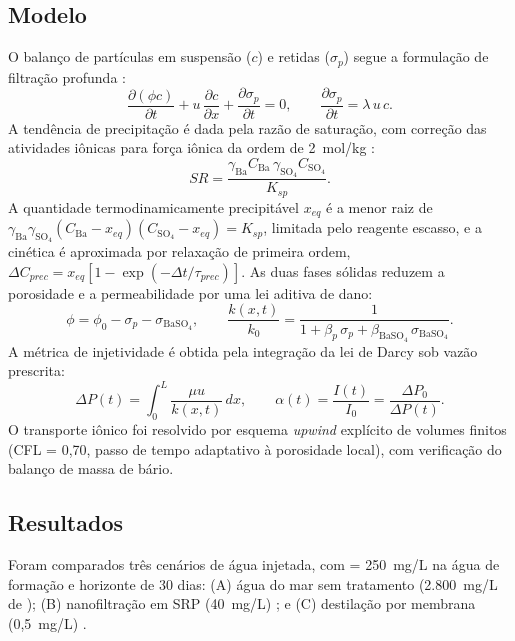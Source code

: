\documentclass[11pt,a4paper]{article}
\begin{document}
\subsection{Modelo}
O balanço de partículas em suspensão ($c$) e retidas ($\sigma_p$) segue a formulação de
filtração profunda \cite{pangsharma1997,bedrikovetsky2001}:
\begin{equation}
\frac{\partial (\phi c)}{\partial t} + u\,\frac{\partial c}{\partial x}
+ \frac{\partial \sigma_p}{\partial t} = 0, \qquad
\frac{\partial \sigma_p}{\partial t} = \lambda\, u\, c .
\end{equation}
A tendência de precipitação é dada pela razão de saturação, com correção das atividades
iônicas para força iônica da ordem de 2~mol/kg \cite{stumm1996,oddo1994}:
\begin{equation}
SR = \frac{\gamma_{\mathrm{Ba}} C_{\mathrm{Ba}}\,\gamma_{\mathrm{SO_4}} C_{\mathrm{SO_4}}}{K_{sp}} .
\end{equation}
A quantidade termodinamicamente precipitável $x_{eq}$ é a menor raiz de
$\gamma_{\mathrm{Ba}}\gamma_{\mathrm{SO_4}}(C_{\mathrm{Ba}}-x_{eq})(C_{\mathrm{SO_4}}-x_{eq}) = K_{sp}$,
limitada pelo reagente escasso, e a cinética é aproximada por relaxação de primeira ordem,
$\Delta C_{prec} = x_{eq}\left[1-\exp(-\Delta t/\tau_{prec})\right]$. As duas fases sólidas
reduzem a porosidade e a permeabilidade por uma lei aditiva de dano:
\begin{equation}
\phi = \phi_0 - \sigma_p - \sigma_{\mathrm{BaSO_4}}, \qquad
\frac{k(x,t)}{k_0} = \frac{1}{1 + \beta_p\,\sigma_p + \beta_{\mathrm{BaSO_4}}\,\sigma_{\mathrm{BaSO_4}}} .
\end{equation}
A métrica de injetividade é obtida pela integração da lei de Darcy sob vazão prescrita:
\begin{equation}
\Delta P(t) = \int_0^L \frac{\mu u}{k(x,t)}\,dx, \qquad
\alpha(t) = \frac{I(t)}{I_0} = \frac{\Delta P_0}{\Delta P(t)} .
\end{equation}
O transporte iônico foi resolvido por esquema \textit{upwind} explícito de volumes finitos
(CFL = 0,70, passo de tempo adaptativo à porosidade local), com verificação do balanço de
massa de bário.

\subsection{Resultados}
Foram comparados três cenários de água injetada, com  = 250~mg/L na água de
formação \cite{bezerra2004} e horizonte de 30 dias: (A) água do mar sem tratamento
(2.800~mg/L de ); (B) nanofiltração em SRP (40~mg/L) \cite{bader2007}; e
(C) destilação por membrana (0,5~mg/L) \cite{alsalmi2020}.
\end{document}
